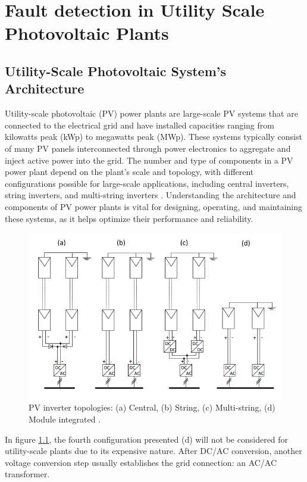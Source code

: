 \chapter{Fault detection in Utility Scale Photovoltaic Plants} \label{chap:chap2}


\section{Utility-Scale Photovoltaic System's Architecture}

Utility-scale photovoltaic (PV) power plants are large-scale PV systems that are connected to the electrical grid and have installed capacities ranging from kilowatts peak (kWp) to megawatts peak (MWp). These systems typically consist of many PV panels interconnected through power electronics to aggregate and inject active power into the grid. The number and type of components in a PV power plant depend on the plant's scale and topology, with different configurations possible for large-scale applications, including central inverters, string inverters, and multi-string inverters \cite{lspv}. Understanding the architecture and components of PV power plants is vital for designing, operating, and maintaining these systems, as it helps optimize their performance and reliability.

\begin{figure}[h]
    \centering
    \includegraphics[width=12cm]{figures/topologies.png}
    \caption{PV inverter topologies:  (a) Central, (b) String, (c) Multi-string,
    (d) Module integrated \cite{lspv}.}
    \label{topologies}
\end{figure}

In figure \ref{topologies}, the fourth configuration presented (d) will not be considered for utility-scale plants due to its expensive nature. After DC/AC conversion, another voltage conversion step usually establishes the grid connection: an AC/AC transformer.

